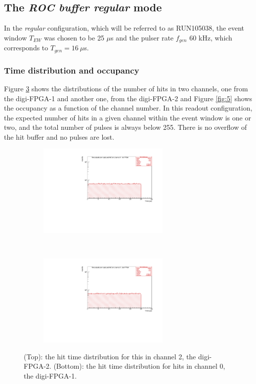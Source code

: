 \subsection{The \textit{ROC buffer regular} mode }
In the \textit{regular} configuration, which will be referred 
to as RUN105038, the event window $T_{EW}$ was chosen to be 25 $\mu$s
and the pulser rate $f_{gen}$ 60 kHz, 
which corresponds to $T_{gen}=16 \ \mu$s.

\subsubsection{Time distribution and occupancy}
Figure \ref{fig:4} shows the 
distributions
of the number of hits in two channels, one from the 
digi-FPGA-1 and another one, from the digi-FPGA-2 and Figure 
\ref{fig:5} shows the occupancy as 
a function of the channel number. 
In this readout configuration, the expected number of 
hits in a given channel
within the event window is one or two, and the total 
number of pulses is always below 255.
There is no overflow of the hit buffer and no pulses are lost.
\begin{figure}[!h]
  \begin{subfigure}[b]{\textwidth}
      \centering
      \includegraphics[width=0.7\textwidth]{figures/pdf/figure_00001_timedistr_roc_simulation_10538.pdf}
      \label{fig:ttt1}
  \end{subfigure}
\\
  \begin{subfigure}[b]{\textwidth}
      \centering
      \includegraphics[width=0.7\textwidth]{figures/pdf/figure_00012_timedistr_roc_simulation_ch2_105038.pdf}
      \label{fig:ttt2}
  \end{subfigure}
     \caption[The hit time distribution.]{(Top): the hit time distribution for this in channel 2, the digi-FPGA-2. 
     (Bottom): the hit time distribution for hits in channel 0, the digi-FPGA-1.}
     \label{fig:4}
\end{figure}

